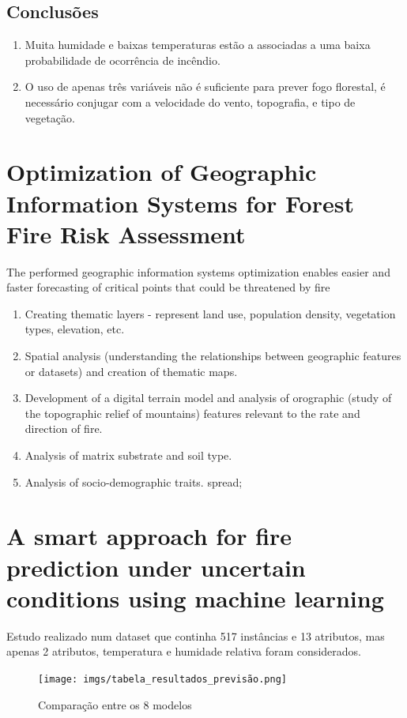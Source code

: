 \documentclass{article}
\begin{document}
\subsection{Conclusões}
\begin{enumerate}
    \item Muita humidade e baixas temperaturas estão a associadas a uma baixa probabilidade de ocorrência de incêndio.
    \item O uso de apenas três variáveis não é suficiente para prever fogo florestal, é necessário conjugar com a velocidade do vento, topografia, e tipo de vegetação.
\end{enumerate}


\section{Optimization of Geographic Information Systems 
for Forest Fire Risk Assessment \cite{9167162}}
The performed geographic information systems optimization enables easier and faster forecasting of critical points that could be threatened by fire
\begin{enumerate}
    \item Creating thematic layers - represent land use, population density, vegetation types, elevation, etc.
    \item Spatial analysis (understanding the relationships between geographic features or datasets) and creation of thematic maps.
    \item Development of a digital terrain model and analysis of orographic (study of the topographic relief of mountains) features relevant to the rate and direction of fire.
    \item Analysis of matrix substrate and soil type.
    \item Analysis of socio-demographic traits.
spread;
\end{enumerate}


\section{A smart approach for fire prediction under uncertain
conditions using machine learning \cite{Sharma2020}}
Estudo realizado num dataset que continha 517 instâncias e 13 atributos, mas apenas 2 atributos, temperatura e humidade relativa foram considerados.

\begin{figure}[ht]
 \centering
  \texttt{[image: imgs/tabela\_resultados\_previsão.png]}
   \caption{\label{fig:model_comparison}Comparação entre os 8 modelos}
\end{figure}
\end{document}
